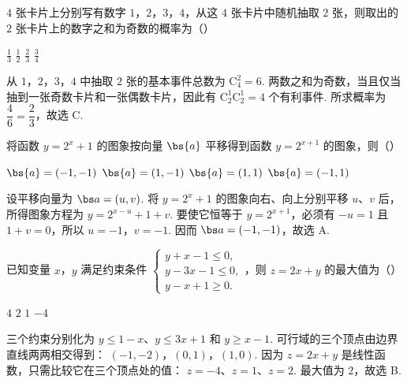 \begin{problem}
\(4\text{ 张}\)卡片上分别写有数字 \(1\)，\(2\)，\(3\)，\(4\)，从这 \(4\text{ 张}\)卡片中随机抽取 \(2\text{ 张}\)，则取出的 \(2\text{ 张}\)卡片上的数字之和为奇数的概率为（\quad）

\choices
    {\(\frac{1}{3}\)}
    {\( \frac{1}{2} \)}
    {\( \frac{2}{3} \)}
    {\( \frac{3}{4} \)}

\begin{solution}
从 \(1\)，\(2\)，\(3\)，\(4\) 中抽取 \(2\) 张的基本事件总数为 \(\mathrm C_4^2=6\). 两数之和为奇数，当且仅当抽到一张奇数卡片和一张偶数卡片，因此有 \(\mathrm C_2^1\mathrm C_2^1=4\) 个有利事件. 所求概率为
\(\dfrac{4}{6}=\dfrac{2}{3}\)，故选 C.
\end{solution}
\end{problem}

\begin{problem}
将函数 \( y = 2^{x} + 1 \) 的图象按向量 \(\bs{a}\) 平移得到函数 \( y = 2^{x + 1} \) 的图象，则（\quad）

\choices
    {\(\bs{a} = (-1, - 1)\)}
    {\(\bs{a} = (1, - 1)\)}
    {\(\bs{a} = (1,1)\)}
    {\(\bs{a} = (-1,1)\)}

\begin{solution}
设平移向量为 \(\bs a=(u,v)\). 将 \(y=2^x+1\) 的图象向右、向上分别平移 \(u\)、\(v\) 后，所得图象方程为
\(y=2^{x-u}+1+v\). 要使它恒等于 \(y=2^{x+1}\)，必须有 \(-u=1\) 且 \(1+v=0\)，所以 \(u=-1\)，\(v=-1\). 因而 \(\bs a=(-1,-1)\)，故选 A.
\end{solution}
\end{problem}

\begin{problem}
已知变量 \(x\)，\(y\) 满足约束条件 \(\begin{cases}
y + x - 1 \leqslant 0,\\
y - 3x - 1 \leqslant 0,\\
y - x + 1 \geqslant 0.
\end{cases}\)，则 \(z = 2x + y\) 的最大值为（\quad）

\choices
    {\(4\)}
    {\(2\)}
    {\(1\)}
    {\(-4\)}

\begin{solution}
三个约束分别化为 \(y\leqslant1-x\)、\(y\leqslant3x+1\) 和 \(y\geqslant x-1\). 可行域的三个顶点由边界直线两两相交得到：
\((-1,-2)\)，\((0,1)\)，\((1,0)\).
因为 \(z=2x+y\) 是线性函数，只需比较它在三个顶点处的值：
\(z=-4\)、\(z=1\)、\(z=2\). 最大值为 \(2\)，故选 B.
\end{solution}
\end{problem}

